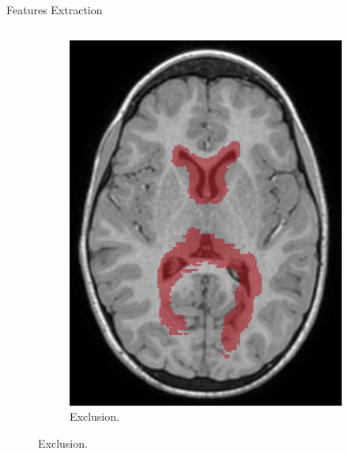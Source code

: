 \documentclass[]{standalone}
\begin{document}
\begin{frame}{Features Extraction}{}
\begin{columns}
\begin{column}{0.60\textwidth}
\begin{figure}[h!]
\begin{subfigure}{0.4\textwidth}
					\includegraphics[scale=0.07]{./IMG/exclude.jpg}
					\caption*{Exclusion.}
				\end{subfigure}
			\end{figure}
			\end{column}
		\end{columns}
	\end{frame}
\end{document}
